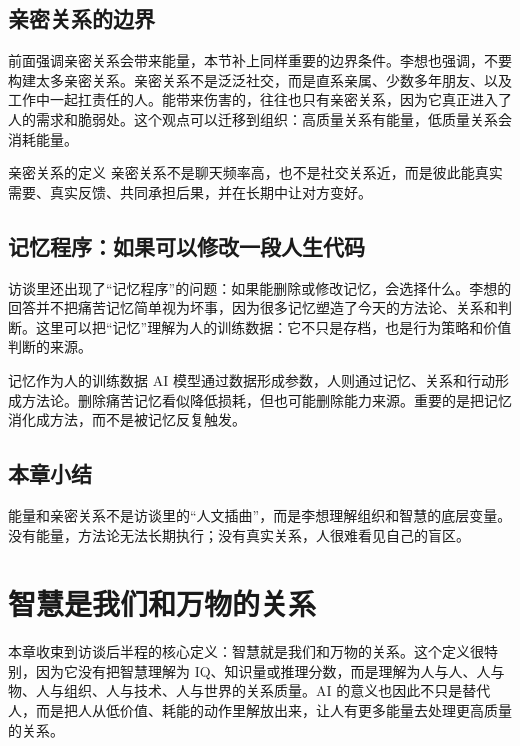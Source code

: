 \documentclass[a4paper]{article}
\begin{document}
\subsection{亲密关系的边界}

前面强调亲密关系会带来能量，本节补上同样重要的边界条件。李想也强调，不要构建太多亲密关系。亲密关系不是泛泛社交，而是直系亲属、少数多年朋友、以及工作中一起扛责任的人。能带来伤害的，往往也只有亲密关系，因为它真正进入了人的需求和脆弱处。这个观点可以迁移到组织：高质量关系有能量，低质量关系会消耗能量。

\begin{importantbox}{亲密关系的定义}
亲密关系不是聊天频率高，也不是社交关系近，而是彼此能真实需要、真实反馈、共同承担后果，并在长期中让对方变好。
\end{importantbox}

\subsection{记忆程序：如果可以修改一段人生代码}

访谈里还出现了“记忆程序”的问题：如果能删除或修改记忆，会选择什么。李想的回答并不把痛苦记忆简单视为坏事，因为很多记忆塑造了今天的方法论、关系和判断。这里可以把“记忆”理解为人的训练数据：它不只是存档，也是行为策略和价值判断的来源。

\begin{knowledgebox}{记忆作为人的训练数据}
AI 模型通过数据形成参数，人则通过记忆、关系和行动形成方法论。删除痛苦记忆看似降低损耗，但也可能删除能力来源。重要的是把记忆消化成方法，而不是被记忆反复触发。
\end{knowledgebox}

\subsection{本章小结}

能量和亲密关系不是访谈里的“人文插曲”，而是李想理解组织和智慧的底层变量。没有能量，方法论无法长期执行；没有真实关系，人很难看见自己的盲区。

\section{智慧是我们和万物的关系}

本章收束到访谈后半程的核心定义：智慧就是我们和万物的关系。这个定义很特别，因为它没有把智慧理解为 IQ、知识量或推理分数，而是理解为人与人、人与物、人与组织、人与技术、人与世界的关系质量。AI 的意义也因此不只是替代人，而是把人从低价值、耗能的动作里解放出来，让人有更多能量去处理更高质量的关系。
\end{document}
